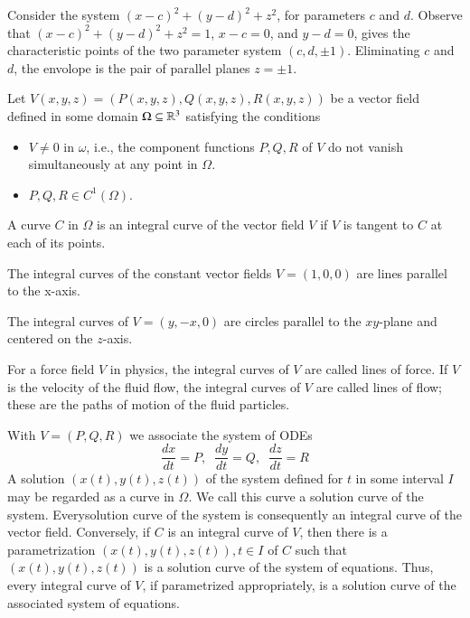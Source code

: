 \documentclass[12pt, a4paper, oneside, openright, titlepage]{book}
\begin{document}
\begin{appendices}
    \begin{eg}
        Consider the system $(x-c)^2+(y-d)^2+z^2$, for parameters $c$ and $d$. Observe that $(x-c)^2+(y-d)^2+z^2=1$, $x-c = 0$, and $y-d = 0$, gives the characteristic points of the two parameter system $(c,d,\pm 1)$. Eliminating $c$ and $d$, the envolope is the pair of parallel planes $z = \pm 1$.
    \end{eg}

    
    Let $V(x,y,z) = (P(x,y,z),Q(x,y,z),R(x,y,z))$ be a vector field defined in some domain $\Omega \subseteq \mathbb R^3$ satisfying the conditions \begin{itemize}
        \item $V\neq 0$ in $\omega$, i.e., the component functions $P,Q,R$ of $V$ do not vanish simultaneously at any point in $\Omega$.
        \item $P,Q,R \in C^1(\Omega)$.
    \end{itemize}

    \begin{defn}
        A curve $C$ in $\Omega$ is an integral curve of the vector field $V$ if $V$ is tangent to $C$ at each of its points.
    \end{defn}

    \begin{eg}
        The integral curves of the constant vector fields $V = (1,0,0)$ are lines parallel to the x-axis.
    \end{eg}

    \begin{eg}
        The integral curves of $V = (y,-x,0)$ are circles parallel to the $xy$-plane and centered on the $z$-axis.
    \end{eg}

    For a force field $V$ in physics, the integral curves of $V$ are called lines of force. If $V$ is the velocity of the fluid flow, the integral curves of $V$ are called lines of flow; these are the paths of motion of the fluid particles.

    With $V = (P,Q,R)$ we associate the system of ODEs \begin{equation*}
        \frac{dx}{dt} = P,\;\;\frac{dy}{dt} = Q,\;\;\frac{dz}{dt} = R
    \end{equation*}
    A solution $(x(t),y(t),z(t))$ of the system defined for $t$ in some interval $I$ may be regarded as a curve in $\Omega$. We call this curve a solution curve of the system. Everysolution curve of the system is consequently an integral curve of the vector field. Conversely, if $C$ is an integral curve of $V$, then there is a parametrization $(x(t),y(t),z(t)),t \in I$ of $C$ such that $(x(t),y(t),z(t))$ is a solution curve of the system of equations. Thus, every integral curve of $V$, if parametrized appropriately, is a solution curve of the associated system of equations. 


\end{appendices}
\end{document}
